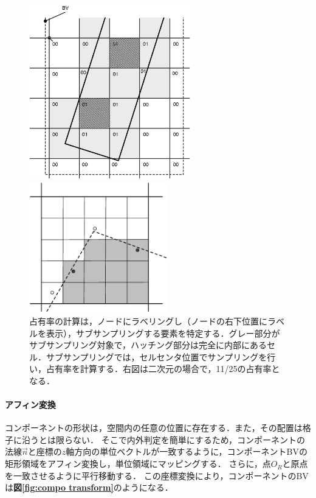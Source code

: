 \begin{figure}[htdp]
\begin{minipage}{0.5\hsize}
\begin{center}
\includegraphics[width=7cm,clip]{compo_BVH.eps}
\end{center}
\end{minipage}
\begin{minipage}{0.45\hsize}
\begin{center}
\includegraphics[width=6cm,clip]{subsampling.eps}
\end{center}
\end{minipage}
\caption{占有率の計算は，ノードにラベリングし（ノードの右下位置にラベルを表示），サブサンプリングする要素を特定する．グレー部分がサブサンプリング対象で，ハッチング部分は完全に内部にあるセル．サブサンプリングでは，セルセンタ位置でサンプリングを行い，占有率を計算する．右図は二次元の場合で，11/25の占有率となる．}
\label{fig:sub-sampling}
\end{figure}

%
\paragraph{アフィン変換}
コンポーネントの形状は，空間内の任意の位置に存在する．また，その配置は格子に沿うとは限らない．
そこで内外判定を簡単にするため，コンポーネントの法線$\overrightarrow{n}$と座標の$z$軸方向の単位ベクトルが一致するように，コンポーネントBVの矩形領域をアフィン変換し，単位領域にマッピングする．
さらに，点$O_R$と原点を一致させるように平行移動する．
この座標変換により，コンポーネントのBVは\textbf{図\ref{fig:compo transform}}のようになる．

